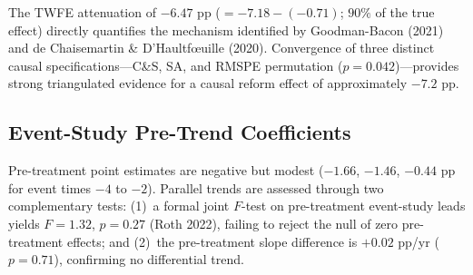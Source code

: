 \documentclass[11pt]{article}
\begin{document}
The TWFE attenuation of $-6.47$ pp ($= -7.18 - (-0.71)$; $90\%$ of the true effect) directly quantifies the mechanism identified by Goodman-Bacon (2021) and de Chaisemartin \& D'Haultf{\oe}uille (2020). Convergence of three distinct causal specifications---C\&S, SA, and RMSPE permutation ($p = 0.042$)---provides strong triangulated evidence for a causal reform effect of approximately $-7.2$ pp.

\subsection{Event-Study Pre-Trend Coefficients}

Pre-treatment point estimates are negative but modest ($-1.66$, $-1.46$, $-0.44$ pp for event times $-4$ to $-2$). Parallel trends are assessed through two complementary tests: (1)~a formal joint $F$-test on pre-treatment event-study leads yields $F = 1.32$, $p = 0.27$ (Roth 2022), failing to reject the null of zero pre-treatment effects; and (2)~the pre-treatment slope difference is $+0.02$ pp/yr ($p = 0.71$), confirming no differential trend.
\end{document}
